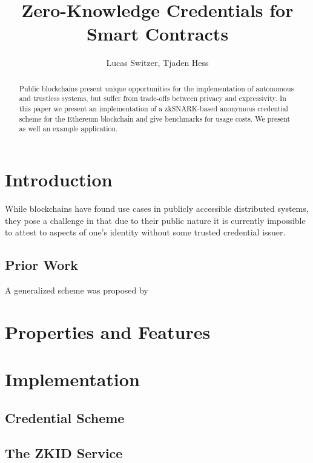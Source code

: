 \documentclass[11 pt]{extarticle}
\theoremstyle{remark}
\begin{document}
\onehalfspacing

\title{Zero-Knowledge Credentials for Smart Contracts}
\author{Lucas Switzer, Tjaden Hess}

\maketitle

\begin{abstract}
	Public blockchains present unique opportunities for the implementation of
	autonomous and trustless systems, but suffer from trade-offs between
	privacy and expressivity. In this paper we present an implementation of a
	zkSNARK-based
	anonymous credential scheme for the Ethereum blockchain and give
	benchmarks for usage costs. We present as well an example application.
\end{abstract}

\section{Introduction}
While blockchains have found use cases in publicly accessible distributed
systems, they pose a challenge in that due to their public nature it is
currently impossible to attest to aspects of one's identity without some
trusted credential issuer.

\subsection{Prior Work}
A generalized scheme was proposed by \citet{garmanDecentralizedAnonymousCredentials2013}

\section{Properties and Features}

\section{Implementation}

\subsection{Credential Scheme}

\subsection{The ZKID Service}
\end{document}
